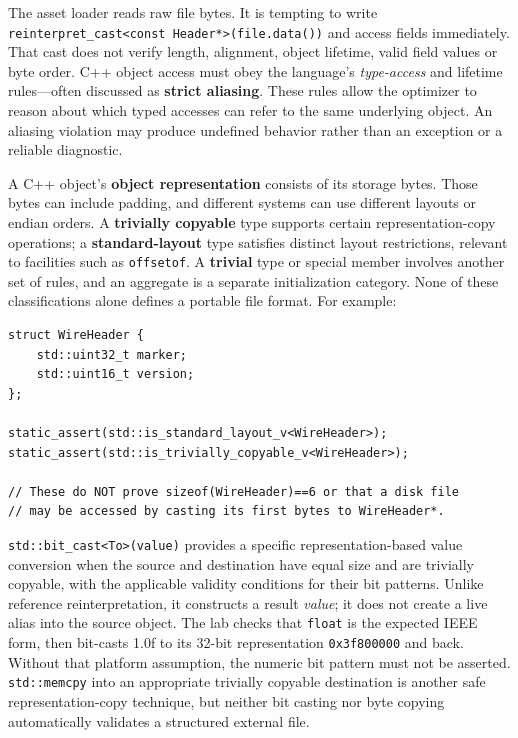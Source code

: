 The asset loader reads raw file bytes. It is tempting to write \texttt{reinterpret\_cast\textless{}const\ Header*\textgreater{}(file.data())} and access fields immediately. That cast does not verify length, alignment, object lifetime, valid field values or byte order. C++ object access must obey the language's \emph{type-access} and lifetime rules---often discussed as \textbf{strict aliasing}. These rules allow the optimizer to reason about which typed accesses can refer to the same underlying object. An aliasing violation may produce undefined behavior rather than an exception or a reliable diagnostic.

A C++ object's \textbf{object representation} consists of its storage bytes. Those bytes can include padding, and different systems can use different layouts or endian orders. A \textbf{trivially copyable} type supports certain representation-copy operations; a \textbf{standard-layout} type satisfies distinct layout restrictions, relevant to facilities such as \texttt{offsetof}. A \textbf{trivial} type or special member involves another set of rules, and an aggregate is a separate initialization category. None of these classifications alone defines a portable file format. For example:

\begin{verbatim}
struct WireHeader {
    std::uint32_t marker;
    std::uint16_t version;
};

static_assert(std::is_standard_layout_v<WireHeader>);
static_assert(std::is_trivially_copyable_v<WireHeader>);

// These do NOT prove sizeof(WireHeader)==6 or that a disk file
// may be accessed by casting its first bytes to WireHeader*.
\end{verbatim}

\texttt{std::bit\_cast\textless{}To\textgreater{}(value)} provides a specific representation-based value conversion when the source and destination have equal size and are trivially copyable, with the applicable validity conditions for their bit patterns. Unlike reference reinterpretation, it constructs a result \emph{value}; it does not create a live alias into the source object. The lab checks that \texttt{float} is the expected IEEE form, then bit-casts 1.0f to its 32-bit representation \texttt{0x3f800000} and back. Without that platform assumption, the numeric bit pattern must not be asserted. \texttt{std::memcpy} into an appropriate trivially copyable destination is another safe representation-copy technique, but neither bit casting nor byte copying automatically validates a structured external file.

